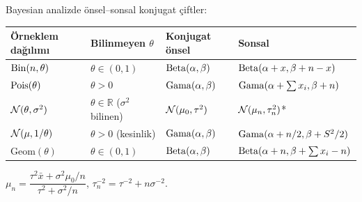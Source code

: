 Bayesian analizde önsel--sonsal konjugat çiftler:

\begin{center}
\renewcommand{\arraystretch}{1.6}
\small
\begin{tabular}{p{3cm}p{3cm}p{4cm}p{3cm}}
\hline
\textbf{Örneklem dağılımı} & \textbf{Bilinmeyen} $\theta$ & \textbf{Konjugat önsel} & \textbf{Sonsal} \\
\hline
$\operatorname{Bin}(n,\theta)$ & $\theta\in(0,1)$ & $\operatorname{Beta}(\alpha,\beta)$ & $\operatorname{Beta}(\alpha+x, \beta+n-x)$ \\
$\operatorname{Pois}(\theta)$ & $\theta>0$ & $\operatorname{Gama}(\alpha,\beta)$ & $\operatorname{Gama}(\alpha+\sum x_i, \beta+n)$ \\
$\mathcal{N}(\theta,\sigma^2)$ & $\theta\in\mathbb{R}$ ($\sigma^2$ bilinen) & $\mathcal{N}(\mu_0,\tau^2)$ & $\mathcal{N}(\mu_n,\tau_n^2)$* \\
$\mathcal{N}(\mu,1/\theta)$ & $\theta>0$ (kesinlik) & $\operatorname{Gama}(\alpha,\beta)$ & $\operatorname{Gama}(\alpha+n/2, \beta+S^2/2)$ \\
$\mathrm{Geom}(\theta)$ & $\theta\in(0,1)$ & $\operatorname{Beta}(\alpha,\beta)$ & $\operatorname{Beta}(\alpha+n, \beta+\sum x_i-n)$ \\
\hline
\end{tabular}
\end{center}

\noindent*$\mu_n = \dfrac{\tau^2\bar{x}+\sigma^2\mu_0/n}{\tau^2+\sigma^2/n}$, $\tau_n^{-2} = \tau^{-2}+n\sigma^{-2}$.
